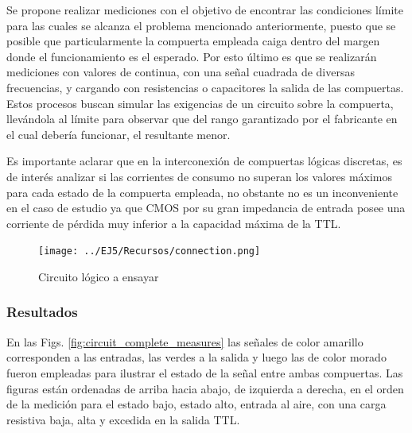 Se propone realizar mediciones con el objetivo de encontrar las condiciones l\'imite para las cuales se alcanza el problema mencionado anteriormente, puesto que se posible que particularmente la 
compuerta empleada caiga dentro del margen donde el funcionamiento es el esperado. Por esto \'ultimo es que se realizar\'an mediciones con valores de continua, con una se\~nal cuadrada de diversas frecuencias,
y cargando con resistencias o capacitores la salida de las compuertas. Estos procesos buscan simular las exigencias de un circuito sobre la compuerta, llev\'andola al l\'imite para observar que del rango garantizado
por el fabricante en el cual deber\'ia funcionar, el resultante menor.


Es importante aclarar que en la interconexi\'on de compuertas l\'ogicas discretas, es de inter\'es analizar si las corrientes de consumo no superan los valores m\'aximos para cada estado
de la compuerta empleada, no obstante no es un inconveniente en el caso de estudio ya que CMOS por su gran impedancia de entrada posee una corriente de p\'erdida muy inferior a la capacidad
m\'axima de la TTL.

\begin{figure}[H]
    \centering
        \texttt{[image: ../EJ5/Recursos/connection.png]}
    \caption{Circuito l\'ogico a ensayar}
    \label{fig:ttl_cmos_connected}
\end{figure}

\subsubsection{Resultados}
En las Figs. \ref{fig:circuit_complete_measures} las se\~nales de color amarillo corresponden a las entradas, las verdes a la salida y luego las de color morado
fueron empleadas para ilustrar el estado de la se\~nal entre ambas compuertas. Las figuras est\'an ordenadas de arriba hacia abajo, de izquierda a derecha, en el orden
de la medici\'on para el estado bajo, estado alto, entrada al aire, con una carga resistiva baja, alta y excedida en la salida TTL.

